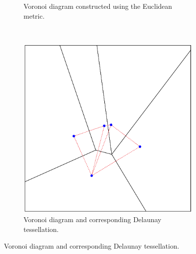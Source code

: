 \documentclass[preprint, 12pt]{elsarticle}
\begin{document}
\begin{figure}
\begin{subfigure}[b]{0.315\textwidth}
		\caption{Voronoi diagram constructed using the Euclidean metric.}
		\label{fig:euclidean}
	\end{subfigure}
	~
	\begin{subfigure}[b]{0.315\textwidth}
		\includegraphics[width=\textwidth]{Graphics/Voronoi_Delaunay.pdf}
		\caption{Voronoi diagram and corresponding Delaunay tessellation.}
		\label{fig:delaunay}
	\end{subfigure}
	\label{fig:voronoi}
\end{figure}
\end{document}
